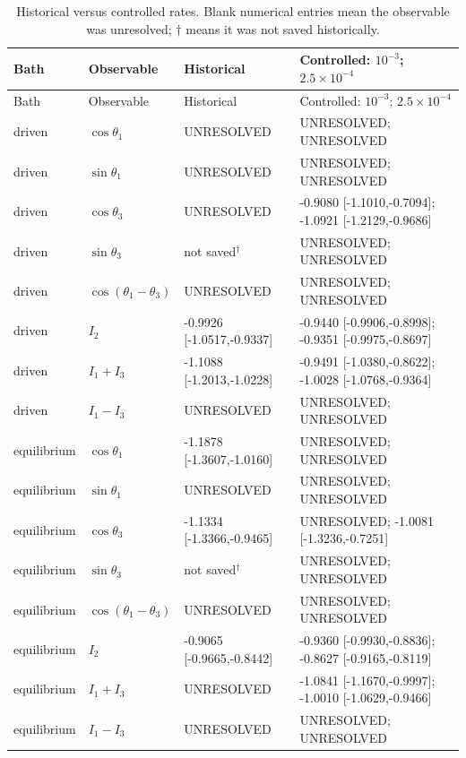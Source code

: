 \begin{longtable}{llll}
\caption{Historical versus controlled rates. Blank numerical entries mean the observable was unresolved; $\dagger$ means it was not saved historically.}\label{tab:comparison}\\
\toprule Bath & Observable & Historical & Controlled: $10^{-3}$; $2.5\times10^{-4}$\\\midrule\endfirsthead
\toprule Bath & Observable & Historical & Controlled: $10^{-3}$; $2.5\times10^{-4}$\\\midrule\endhead
driven & $\cos\theta_1$ & UNRESOLVED & UNRESOLVED; UNRESOLVED \\
driven & $\sin\theta_1$ & UNRESOLVED & UNRESOLVED; UNRESOLVED \\
driven & $\cos\theta_3$ & UNRESOLVED & -0.9080 [-1.1010,-0.7094]; -1.0921 [-1.2129,-0.9686] \\
driven & $\sin\theta_3$ & not saved$^\dagger$ & UNRESOLVED; UNRESOLVED \\
driven & $\cos(\theta_1-\theta_3)$ & UNRESOLVED & UNRESOLVED; UNRESOLVED \\
driven & $I_2$ & -0.9926 [-1.0517,-0.9337] & -0.9440 [-0.9906,-0.8998]; -0.9351 [-0.9975,-0.8697] \\
driven & $I_1+I_3$ & -1.1088 [-1.2013,-1.0228] & -0.9491 [-1.0380,-0.8622]; -1.0028 [-1.0768,-0.9364] \\
driven & $I_1-I_3$ & UNRESOLVED & UNRESOLVED; UNRESOLVED \\
equilibrium & $\cos\theta_1$ & -1.1878 [-1.3607,-1.0160] & UNRESOLVED; UNRESOLVED \\
equilibrium & $\sin\theta_1$ & UNRESOLVED & UNRESOLVED; UNRESOLVED \\
equilibrium & $\cos\theta_3$ & -1.1334 [-1.3366,-0.9465] & UNRESOLVED; -1.0081 [-1.3236,-0.7251] \\
equilibrium & $\sin\theta_3$ & not saved$^\dagger$ & UNRESOLVED; UNRESOLVED \\
equilibrium & $\cos(\theta_1-\theta_3)$ & UNRESOLVED & UNRESOLVED; UNRESOLVED \\
equilibrium & $I_2$ & -0.9065 [-0.9665,-0.8442] & -0.9360 [-0.9930,-0.8836]; -0.8627 [-0.9165,-0.8119] \\
equilibrium & $I_1+I_3$ & UNRESOLVED & -1.0841 [-1.1670,-0.9997]; -1.0010 [-1.0629,-0.9466] \\
equilibrium & $I_1-I_3$ & UNRESOLVED & UNRESOLVED; UNRESOLVED \\
\bottomrule\end{longtable}
